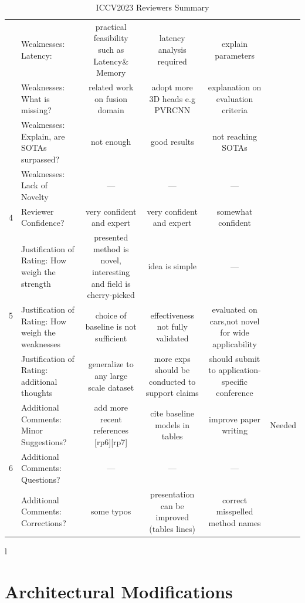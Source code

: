\documentclass[10pt,twocolumn,letterpaper]{article}
\begin{document}
\begin{table}[h!]
{\begin{tabular}{l|lcccc}
         & Weaknesses: Latency: & practical feasibility such as Latency\& Memory & latency analysis required & explain parameters& \color{blue}{Already Done} \\  
         & Weaknesses: What is missing? & related work on fusion domain & adopt more 3D heads e.g PVRCNN & explanation on evaluation criteria & \color{red}{Needed}\\
         & Weaknesses: Explain, are SOTAs surpassed? & not enough & good results & not reaching SOTAs &  \color{blue}{Needed} \\
         & Weaknesses: Lack of Novelty & --- & --- & ---&  \color{blue}{Almost Okay} \\
         \hline
         4 & Reviewer Confidence? & very confident and expert & very confident and expert & somewhat confident &  \\
         \hline
         \multirow{3}{*}{5}& Justification of Rating: How weigh the strength & presented method is novel, interesting and field is cherry-picked & idea is simple & --- & \color{blue}{Idea is Novel} \\
         & Justification of Rating: How weigh the weaknesses & choice of baseline is not sufficient & effectiveness not fully validated & evaluated on cars,not novel for wide applicability & \color{red}{Needed} \\
         & Justification of Rating: additional thoughts & generalize to any large scale dataset& more exps should be conducted to support claims& should submit to application-specific conference & \color{red}{Needed} \\
         \hline
         \multirow{3}{*}{6}& Additional Comments: Minor Suggestions? & add more recent references [rp6][rp7]  & cite baseline models in tables & improve paper writing & \color{black} {Needed} \\
         & Additional Comments: Questions? & --- & ---& ---&  \\
         & Additional Comments: Corrections? & some typos & presentation can be improved (tables lines) & correct misspelled method names& \color{black}{Needed} \\
         \hline
    \end{tabular}
    }%
    \caption{ICCV2023 Reviewers Summary}
    \label{tab:ReviewersSummary}l
\end{table}




\section{Architectural Modifications}
\end{document}
